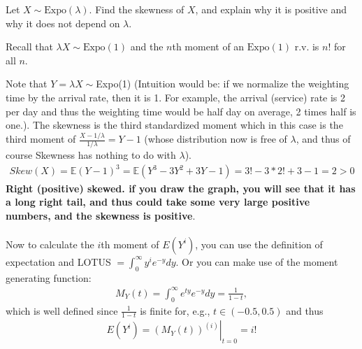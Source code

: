 
\setcounter{theorem}{15}
\begin{exercise} [BH.6.16]
    Let $X \sim \text{Expo}(\lambda)$. Find the skewness of $X$, and explain why it is positive and why it does not depend on $\lambda$.
	\begin{hint}
		Recall that $\lambda X \sim \text{Expo}(1)$ and the $n$th moment of an $\text{Expo}(1)$ r.v. is $n!$ for all $n$.
	\end{hint}
	\begin{solution}
		Note that $Y=\lambda X\sim $Expo(1) (Intuition would be: if we normalize the weighting time by the arrival rate, then it is 1. For example, the arrival (service) rate is 2 per day and thus the weighting time would be half day on average, 2 times half is one.). The skewness  is the third standardized moment which in this case is the third moment of $\frac{X-1/\lambda}{1/\lambda} = Y-1$ (whose distribution now is free of $\lambda$, and thus of course Skewness has nothing to do with $\lambda$).
		\begin{align*}
			Skew(X) =\mathbb{E}(Y-1)^3= \mathbb{E}(Y^3-3Y^2+3Y-1)=3! -3*2! +3-1=2>0
		\end{align*} 
		\textbf{Right (positive) skewed. if you draw the graph, you will see that it has a long right tail, and thus could take some very large positive numbers, and the skewness is positive}.~\\~\\
		Now to calculate the $i$th moment of $E(Y^i)$, you can use the definition of expectation and LOTUS $=\int_{0}^{\infty} y^i e^{-y}dy$.  Or you can make use of the moment generating function:
		\begin{align*}
			M_Y(t) = \int_{0}^{\infty} e^{ty} e^{-y}dy =\frac{1}{1-t},
		\end{align*}
		which is well defined since $\frac{1}{1-t}$ is finite for, e.g., $t\in(-0.5, 0.5)$ and thus 
		\begin{align*}
			E(Y^i) =\left.\left(M_Y(t)  \right)^{(i)}\right|_{t=0} = i!
		\end{align*} 
\end{solution}
\end{exercise}

